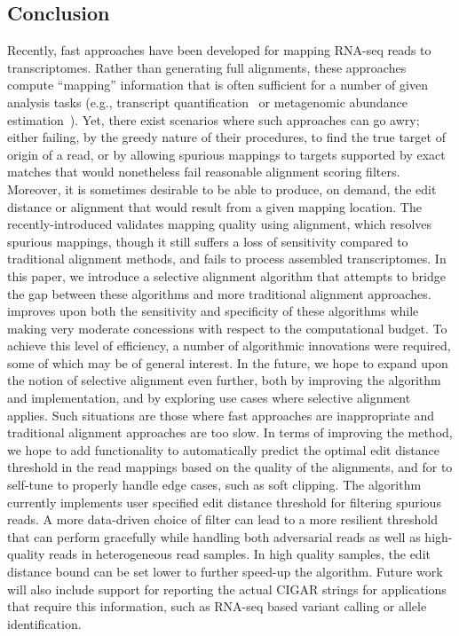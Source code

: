 \subsection{Conclusion}
Recently, fast \nab approaches have been developed for mapping RNA-seq reads to transcriptomes. Rather than 
generating full alignments, these approaches compute ``mapping'' information that is often sufficient for 
a number of  given analysis tasks (e.g., transcript 
quantification~\citep{Patro2014Sailfish,zhang2014rna,Bray2016Kallisto,Patro2017Salmon,ju2017fleximer} 
or metagenomic abundance estimation~\citep{Schaeffer2017}). Yet, there exist scenarios where such \nab approaches 
can go awry; either failing, by the greedy nature of their procedures, to find the true target of origin of 
a read, or by allowing spurious mappings to targets supported by exact matches that would nonetheless fail 
reasonable alignment scoring filters. Moreover, it is sometimes desirable to be able to produce, on demand, 
the edit distance or alignment that would result from a given mapping location. The recently-introduced \hera 
validates mapping quality using alignment, which resolves spurious mappings, though it still suffers a loss of 
sensitivity compared to traditional alignment methods, and fails to process \denovo assembled transcriptomes. 
In this paper, we introduce a selective alignment algorithm that attempts to bridge the gap between these \nab 
algorithms and more traditional alignment approaches. \Sla improves upon both the sensitivity and specificity 
of these \nab algorithms while making very moderate concessions with respect to the computational budget. 
To achieve this level of efficiency, a number of algorithmic innovations were required, some of which may be of 
general interest. In the future, we hope to expand upon the notion of selective alignment even further, both by 
improving the algorithm and implementation, and by exploring use cases where selective alignment applies. Such 
situations are those where fast \nab approaches are inappropriate and traditional alignment approaches are too 
slow. In terms of improving the method, we hope to add functionality to automatically predict the optimal edit 
distance threshold in the read mappings based on the quality of the alignments, and for \sla to self-tune to 
properly handle edge cases, such as soft clipping. The \sla algorithm currently implements user specified edit 
distance threshold for filtering spurious reads. A more data-driven choice of filter can lead to a more resilient 
threshold that can perform gracefully while handling both adversarial reads as well as high-quality reads in 
heterogeneous read samples. In high quality samples, the edit distance bound can be set lower to further 
speed-up the algorithm. Future work will also include support for reporting the actual CIGAR strings for 
applications that require this information, such as RNA-seq based variant calling or allele identification.

